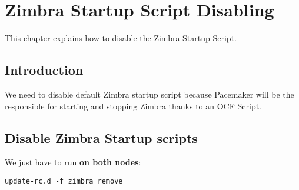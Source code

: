 

\chapter{Zimbra Startup Script Disabling}
\label{chap:zimbra-startup-script-disabling}
This chapter explains how to disable the Zimbra Startup Script.

\section {Introduction}
We need to disable default Zimbra startup script because Pacemaker will be the responsible for starting and stopping Zimbra thanks to an OCF Script.

\section {Disable Zimbra Startup scripts}
We just have to run \textbf{on both nodes}:
\begin{verbatim}
update-rc.d -f zimbra remove
\end{verbatim}
